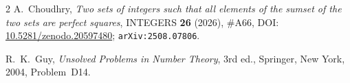 \documentclass[11pt]{article}
\begin{document}
\begin{thebibliography}{2}
A.~Choudhry,
\emph{Two sets of integers such that all elements of the sumset of the two sets are perfect squares},
INTEGERS \textbf{26} (2026), \#A66,
DOI: \href{https://doi.org/10.5281/zenodo.20597480}{10.5281/zenodo.20597480};
\texttt{arXiv:2508.07806}.

R.~K.~Guy,
\emph{Unsolved Problems in Number Theory}, 3rd ed.,
Springer, New York, 2004, Problem~D14.
\end{thebibliography}
\end{document}
